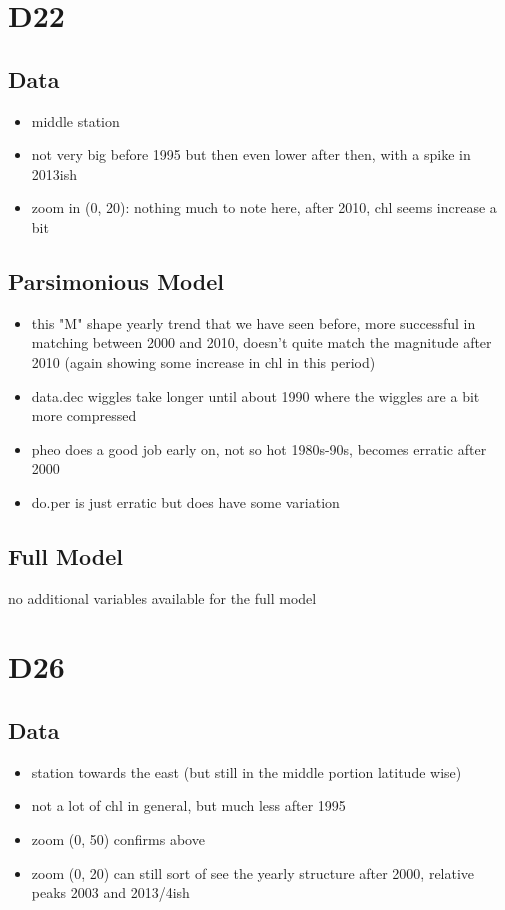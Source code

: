 \documentclass[12pt]{amsart}
\begin{document}
\section{D22}
\subsection{Data}
\begin{itemize}
\item middle station
\item not very big before 1995 but then even lower after then, with a spike in 2013ish
\item zoom in (0, 20): nothing much to note here, after 2010, chl seems increase a bit
\end{itemize}
\subsection{Parsimonious Model}
\begin{itemize}
\item this "M" shape yearly trend that we have seen before, more successful in matching between 2000 and 2010, doesn't quite match the magnitude after 2010 (again showing some increase in chl in this period)
\item data.dec wiggles take longer until about 1990 where the wiggles are a bit more compressed
\item pheo does a good job early on, not so hot 1980s-90s, becomes erratic after 2000
\item do.per is just erratic but does have some variation
\end{itemize}
\subsection{Full Model}
\begin{itemize}
\ite no additional variables available for the full model
\end{itemize}

\section{D26}
\subsection{Data}
\begin{itemize}
\item station towards the east (but still in the middle portion latitude wise)
\item not a lot of chl in general, but much less after 1995
\item zoom (0, 50) confirms above
\item zoom (0, 20) can still sort of see the yearly structure after 2000, relative peaks 2003 and 2013/4ish
\end{itemize}
\end{document}
